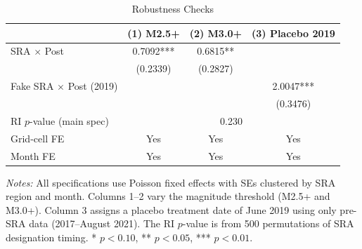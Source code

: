 \begin{table}[htbp]
\centering
\caption{Robustness Checks}
\label{tab:robustness}
\begin{threeparttable}
\begin{tabular}{lccc}
\toprule
 & (1) M2.5+ & (2) M3.0+ & (3) Placebo 2019 \\
\midrule
SRA $\times$ Post & 0.7092*** & 0.6815** & \\
 & (0.2339) & (0.2827) & \\
Fake SRA $\times$ Post (2019) & & & 2.0047*** \\
 & & & (0.3476) \\
[0.5em]
RI $p$-value (main spec) & \multicolumn{3}{c}{0.230} \\
\midrule
Grid-cell FE & Yes & Yes & Yes \\
Month FE & Yes & Yes & Yes \\
\bottomrule
\end{tabular}
\begin{tablenotes}[flushleft]\small
\item \textit{Notes:} All specifications use Poisson fixed effects with SEs clustered by SRA region and month. Columns 1--2 vary the magnitude threshold (M2.5+ and M3.0+). Column 3 assigns a placebo treatment date of June 2019 using only pre-SRA data (2017--August 2021). The RI $p$-value is from 500 permutations of SRA designation timing. * $p<0.10$, ** $p<0.05$, *** $p<0.01$.
\end{tablenotes}
\end{threeparttable}
\end{table}
